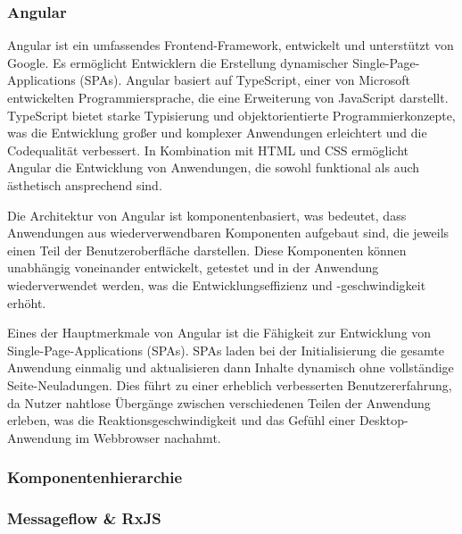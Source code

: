 \documentclass[../main.tex]{subfiles}
\begin{document}
\subsubsection{Angular}
Angular ist ein umfassendes Frontend-Framework, entwickelt und unterstützt von Google. Es ermöglicht Entwicklern die Erstellung dynamischer 
Single-Page-Applications (SPAs). Angular basiert auf TypeScript, einer von Microsoft entwickelten Programmiersprache, die eine Erweiterung 
von JavaScript darstellt. TypeScript bietet starke Typisierung und objektorientierte Programmierkonzepte, was die Entwicklung großer und 
komplexer Anwendungen erleichtert und die Codequalität verbessert. In Kombination mit HTML und CSS ermöglicht Angular die Entwicklung von 
Anwendungen, die sowohl funktional als auch ästhetisch ansprechend sind.



Die Architektur von Angular ist komponentenbasiert, was bedeutet, dass Anwendungen aus wiederverwendbaren Komponenten aufgebaut sind, die 
jeweils einen Teil der Benutzeroberfläche darstellen. Diese Komponenten können unabhängig voneinander entwickelt, getestet und in der 
Anwendung wiederverwendet werden, was die Entwicklungseffizienz und -geschwindigkeit erhöht.

Eines der Hauptmerkmale von Angular ist die Fähigkeit zur Entwicklung von Single-Page-Applications (SPAs). SPAs laden bei der Initialisierung 
die gesamte Anwendung einmalig und aktualisieren dann Inhalte dynamisch ohne vollständige Seite-Neuladungen. Dies führt zu einer erheblich 
verbesserten Benutzererfahrung, da Nutzer nahtlose Übergänge zwischen verschiedenen Teilen der Anwendung erleben, was die Reaktionsgeschwindigkeit 
und das Gefühl einer Desktop-Anwendung im Webbrowser nachahmt.

\subsubsection{Komponentenhierarchie}
\subsubsection{Messageflow \& RxJS}
\end{document}
